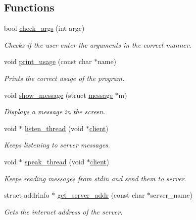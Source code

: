 \subsection*{Functions}
\begin{DoxyCompactItemize}
\item 
bool \hyperlink{zip-zop-client_8c_ae42aaff0193542f01451e25d0d0e6725}{check\+\_\+args} (int argc)
\begin{DoxyCompactList}\small\item\em Checks if the user enter the arguments in the correct manner. \end{DoxyCompactList}\item 
void \hyperlink{zip-zop-client_8c_a120fec5c70bad673e9b1c2e91b28fe5f}{print\+\_\+usage} (const char $\ast$name)
\begin{DoxyCompactList}\small\item\em Prints the correct usage of the program. \end{DoxyCompactList}\item 
void \hyperlink{zip-zop-client_8c_aec5550cf115ba01d0da023ba9d1876bb}{show\+\_\+message} (struct \hyperlink{structmessage}{message} $\ast$m)
\begin{DoxyCompactList}\small\item\em Displays a message in the screen. \end{DoxyCompactList}\item 
void $\ast$ \hyperlink{zip-zop-client_8c_aafa1438575f3295609976f35a6518cca}{listen\+\_\+thread} (void $\ast$\hyperlink{structclient}{client})
\begin{DoxyCompactList}\small\item\em Keeps listening to server messages. \end{DoxyCompactList}\item 
void $\ast$ \hyperlink{zip-zop-client_8c_a7ca038c133aa6aca1c539e69d4ee675f}{speak\+\_\+thread} (void $\ast$\hyperlink{structclient}{client})
\begin{DoxyCompactList}\small\item\em Keeps reading messages from {\ttfamily stdin} and send them to server. \end{DoxyCompactList}\item 
struct addrinfo $\ast$ \hyperlink{zip-zop-client_8c_a76840de4643d86b9d0a968ec2d1acae3}{get\+\_\+server\+\_\+addr} (const char $\ast$server\+\_\+name)
\begin{DoxyCompactList}\small\item\em Gets the internet address of the server. \end{DoxyCompactList}\item 

\end{DoxyCompactItemize}
